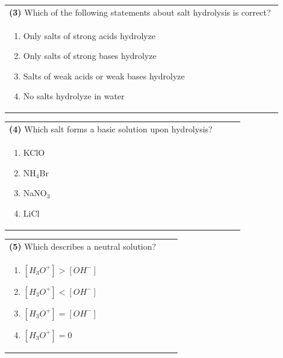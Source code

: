 \documentclass{article}
\begin{document}
\noindent\begin{tabular}{|p{0.9\linewidth}|}
\hline
\textbf{(3)} Which of the following statements about salt hydrolysis is correct? \\[0.2cm]
\begin{minipage}{0.85\linewidth}
\begin{enumerate}[label=\alph*.]
\item Only salts of strong acids hydrolyze
\item Only salts of strong bases hydrolyze
\item Salts of weak acids or weak bases hydrolyze
\item No salts hydrolyze in water
\end{enumerate}
\end{minipage}\\[0.2cm]
\hline
\end{tabular}

\noindent\begin{tabular}{|p{0.9\linewidth}|}
\hline
\textbf{(4)} Which salt forms a basic solution upon hydrolysis? \\[0.2cm]
\begin{minipage}{0.85\linewidth}
\begin{enumerate}[label=\alph*.]
\item KClO \item NH$_4$Br \item NaNO$_3$ \item LiCl
\end{enumerate}
\end{minipage}\\[0.2cm]
\hline
\end{tabular}
\newpage

\noindent\begin{tabular}{|p{0.9\linewidth}|}
\hline
\textbf{(5)} Which describes a neutral solution? \\[0.2cm]
\begin{minipage}{0.85\linewidth}
\begin{enumerate}[label=\alph*.]
\item $[H_3O^+] > [OH^-]$
\item $[H_3O^+] < [OH^-]$
\item $[H_3O^+] = [OH^-]$
\item $[H_3O^+] = 0$
\end{enumerate}
\end{minipage}\\[0.2cm]
\hline
\end{tabular}
\end{document}
